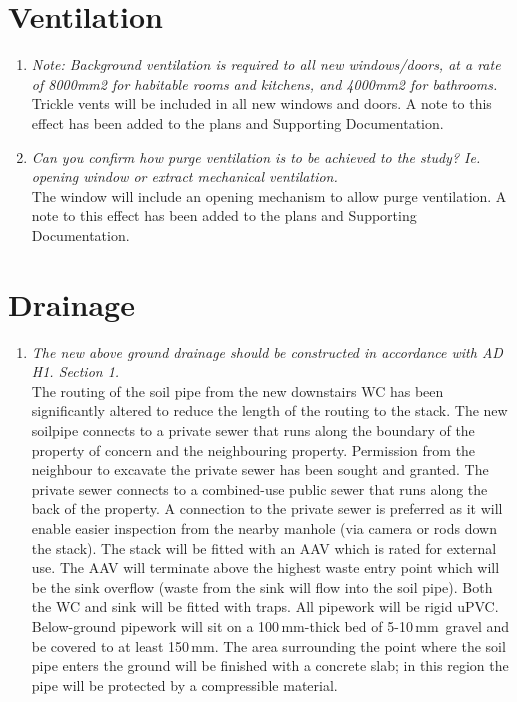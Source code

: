 \documentclass{extension}
\newcommand{\mm}{\,$\mathrm{mm}$}
\begin{document}
\section{Ventilation}
\begin{enumerate}
\item {\it Note: Background ventilation is required to all new windows/doors, at a rate of 8000mm2 for habitable rooms and kitchens, and 4000mm2 for bathrooms.}\\
Trickle vents will be included in all new windows and doors. A note to this effect has been added to the plans and Supporting Documentation.
\item {\it Can you confirm how purge ventilation is to be achieved to the study? Ie. opening window or extract mechanical ventilation.}\\
The window will include an opening mechanism to allow purge ventilation. A note to this effect has been added to the plans and Supporting Documentation.
\end{enumerate}

\section{Drainage}
\begin{enumerate}
\item {\it The new above ground drainage should be constructed in accordance with AD H1. Section 1.}\\
The routing of the soil pipe from the new downstairs WC has been significantly altered to reduce the length of the routing to the stack. The new soilpipe connects to a private sewer that runs along the boundary of the property of concern and the neighbouring property. Permission from the neighbour to excavate the private sewer has been sought and granted. The private sewer connects to a combined-use public sewer that runs along the back of the property. A connection to the private sewer is preferred as it will enable easier inspection from the nearby manhole (via camera or rods down the stack). The stack will be fitted with an AAV which is rated for external use.\cite{aav} The AAV will terminate above the highest waste entry point which will be the sink overflow (waste from the sink will flow into the soil pipe). Both the WC and sink will be fitted with traps. All pipework will be rigid uPVC. Below-ground pipework will sit on a 100\mm -thick bed of 5-10\mm\ gravel and be covered to at least 150\mm. The area surrounding the point where the soil pipe enters the ground will be finished with a concrete slab; in this region the pipe will be protected by a compressible material.
\end{enumerate}
\end{document}
